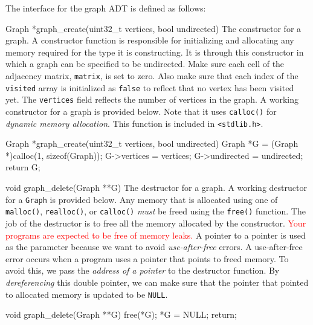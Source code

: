 The interface for the graph ADT is defined as
follows:

\begin{funcdoc}{Graph *graph\_create(uint32\_t vertices, bool undirected)}
  The constructor for a graph. A constructor function is responsible for
  initializing and allocating any memory required for the type it is
  constructing. It is through this constructor in which a graph can be
  specified to be undirected. Make sure each cell of the adjacency
  matrix, \texttt{matrix}, is set to zero. Also make sure that each
  index of the \texttt{visited} array is initialized as \texttt{false}
  to reflect that no vertex has been visited yet. The \texttt{vertices}
  field reflects the number of vertices in the graph. A working
  constructor for a graph is provided below. Note that it uses
  \texttt{calloc()} for \emph{dynamic memory allocation}. This function
  is included in \texttt{<stdlib.h>}.

  \begin{clisting}{}
Graph *graph_create(uint32_t vertices, bool undirected) {
    Graph *G = (Graph *)calloc(1, sizeof(Graph));
    G->vertices = vertices;
    G->undirected = undirected;
    return G;
}
  \end{clisting}

\end{funcdoc}

\begin{funcdoc}{void graph\_delete(Graph **G)}
  The destructor for a graph. A working destructor for a \texttt{Graph}
  is provided below. Any memory that is allocated using one of
  \texttt{malloc()}, \texttt{realloc()}, or \texttt{calloc()}
  \emph{must} be freed using the \texttt{free()} function. The job of
  the destructor is to free all the memory allocated by the constructor.
  \textcolor{red}{Your programs are expected to be free of memory
  leaks.} A pointer to a pointer is used as the parameter because we
  want to avoid \emph{use-after-free} errors. A use-after-free error
  occurs when a program uses a pointer that points to freed memory. To
  avoid this, we pass the \emph{address of a pointer} to the destructor
  function. By \emph{dereferencing} this double pointer, we can make
  sure that the pointer that pointed to allocated memory is updated to
  be \texttt{NULL}.

  \begin{clisting}{}
void graph_delete(Graph **G) {
    free(*G);
    *G = NULL;
    return;
}
  \end{clisting}
\end{funcdoc}

